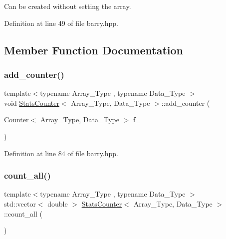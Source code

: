 Can be created without setting the array. 



Definition at line 49 of file barry.\+hpp.



\subsection{Member Function Documentation}
\mbox{\label{classbarry_1_1_stats_counter_ad175dcd2bd30d017881783de546ac333}} 
\subsubsection{\texorpdfstring{add\+\_\+counter()}{add\_counter()}}
{\footnotesize\ttfamily template$<$typename Array\+\_\+\+Type , typename Data\+\_\+\+Type $>$ \\
void \hyperlink{classbarry_1_1_stats_counter}{Stats\+Counter}$<$ Array\+\_\+\+Type, Data\+\_\+\+Type $>$\+::add\+\_\+counter (\begin{DoxyParamCaption}\item[{\hyperlink{classbarry_1_1_counter}{Counter}$<$ Array\+\_\+\+Type, Data\+\_\+\+Type $>$}]{f\+\_\+ }\end{DoxyParamCaption})\hspace{0.3cm}{\ttfamily [inline]}}



Definition at line 84 of file barry.\+hpp.

\mbox{\label{classbarry_1_1_stats_counter_a83bd92031a1499109c98f238221cbd67}} 
\subsubsection{\texorpdfstring{count\+\_\+all()}{count\_all()}}
{\footnotesize\ttfamily template$<$typename Array\+\_\+\+Type , typename Data\+\_\+\+Type $>$ \\
std\+::vector$<$ double $>$ \hyperlink{classbarry_1_1_stats_counter}{Stats\+Counter}$<$ Array\+\_\+\+Type, Data\+\_\+\+Type $>$\+::count\+\_\+all (\begin{DoxyParamCaption}{ }\end{DoxyParamCaption})\hspace{0.3cm}{\ttfamily [inline]}}



